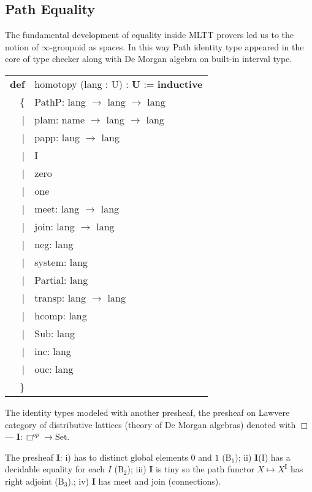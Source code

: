\documentclass[a4paper,UKenglish,cleveref, autoref, thm-restate]{lipics-v2021}
\newcommand{\tabstyle}[0]{\scriptsize\ttfamily\fontseries{l}\selectfont}
\begin{document}
\newpage
\subsection{Path Equality}

The fundamental development of equality inside MLTT provers led us to the
notion of $\infty$-groupoid as spaces. In this way Path identity type appeared
in the core of type checker along with De Morgan algebra on built-in interval type.

\begin{table}[ht]
\tabstyle
\begin{tabular}{rl}
     \textbf{def} & homotopy (lang : U) : \textbf{U} := \textbf{inductive} \\
               \{ & PathP: lang $\rightarrow$ lang $\rightarrow$ lang \\
  |& plam: name $\rightarrow$ lang $\rightarrow$ lang \\
  |& papp: lang $\rightarrow$ lang \\
  |& I \\
  |& zero \\
  |& one \\
  |& meet: lang $\rightarrow$ lang \\
  |& join: lang $\rightarrow$ lang \\
  |& neg: lang \\
  |& system: lang \\
  |& Partial: lang \\
  |& transp: lang $\rightarrow$ lang \\
  |& hcomp: lang \\
  |& Sub: lang \\
  |& inc: lang \\
  |& ouc: lang \\
 \}& \\
\end{tabular}
\end{table}

\begin{definition}
The identity types modeled with another presheaf, the presheaf on Lawvere
category of distributive lattices (theory of De Morgan algebras) denoted
with $\Box$ — $\textbf{I} : \Box^{op} \rightarrow \textrm{Set}$.
\end{definition}

\begin{definition} The presheaf $\textbf{I}$:
i) has to distinct global elements $0$ and $1$ (B$_1$);
ii) $\textbf{I}$(I) has a decidable equality for each $I$ (B$_2$);
iii) $\textbf{I}$ is tiny so the path functor $X \mapsto X^\textbf{I}$ has right adjoint (B$_3$).;
iv) $\textbf{I}$ has meet and join (connections).
\end{definition}
\end{document}
